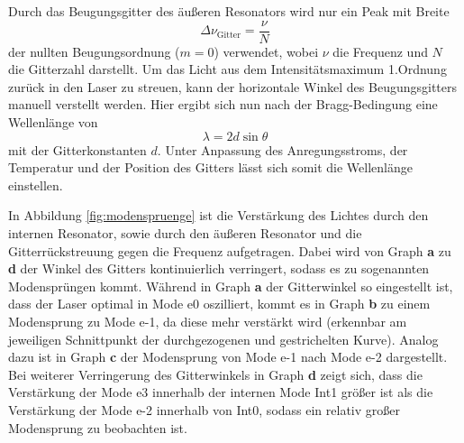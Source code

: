 Durch das Beugungsgitter des äußeren Resonators wird nur ein Peak mit Breite
\begin{equation}
  \Delta\nu_{\text{Gitter}} = \frac{\nu}{N}
\end{equation}
der nullten Beugungsordnung ($m=\num{0}$) verwendet, wobei $\nu$ die Frequenz
und $N$ die Gitterzahl darstellt. Um das Licht aus dem Intensitätsmaximum 1.Ordnung
zurück in den Laser zu streuen, kann der horizontale Winkel \theta des Beugungsgitters
manuell verstellt werden. Hier ergibt sich nun nach der Bragg-Bedingung eine
Wellenlänge von
\begin{equation}
    \lambda = 2d\sin{\theta}
\end{equation}
mit der Gitterkonstanten $d$.
Unter Anpassung des Anregungsstroms, der Temperatur und der Position des Gitters
lässt sich somit die Wellenlänge einstellen.


In Abbildung \ref{fig:modenspruenge} ist die Verstärkung des Lichtes durch den internen
Resonator, sowie durch den äußeren Resonator und die Gitterrückstreuung gegen
die Frequenz aufgetragen.
Dabei wird von Graph \textbf{a} zu \textbf{d} der Winkel des Gitters kontinuierlich verringert,
sodass es zu sogenannten Modensprüngen kommt.
Während in Graph \textbf{a} der Gitterwinkel so eingestellt ist, dass der Laser optimal in
Mode e0 oszilliert, kommt es in Graph \textbf{b} zu einem Modensprung zu Mode e-1,
da diese mehr verstärkt wird (erkennbar am jeweiligen Schnittpunkt der durchgezogenen und
gestrichelten Kurve).
Analog dazu ist in Graph \textbf{c} der Modensprung von Mode e-1 nach Mode e-2
dargestellt.
Bei weiterer Verringerung des Gitterwinkels in Graph \textbf{d} zeigt sich,
dass die Verstärkung der Mode e3 innerhalb der internen Mode Int1 größer ist
als die Verstärkung der Mode e-2 innerhalb von Int0, sodass ein relativ großer
Modensprung zu beobachten ist.


